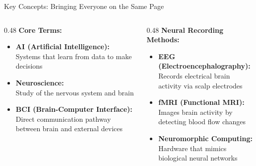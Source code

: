 \documentclass[aspectratio=169]{beamer}
\begin{document}
\begin{frame}{Key Concepts: Bringing Everyone on the Same Page}
  \begin{columns}[T]
    \begin{column}{0.48\textwidth}
      \textbf{Core Terms:}
      \begin{itemize}
        \item \textbf{AI (Artificial Intelligence):}\\
        {\small Systems that learn from data to make decisions}
        
        \item \textbf{Neuroscience:}\\
        {\small Study of the nervous system and brain}
        
        \item \textbf{BCI (Brain-Computer Interface):}\\
        {\small Direct communication pathway between brain and external devices}
      \end{itemize}
    \end{column}
    
    \begin{column}{0.48\textwidth}
      \textbf{Neural Recording Methods:}
      \begin{itemize}
        \item \textbf{EEG (Electroencephalography):}\\
        {\small Records electrical brain activity via scalp electrodes}
        
        \item \textbf{fMRI (Functional MRI):}\\
        {\small Images brain activity by detecting blood flow changes}
        
        \item \textbf{Neuromorphic Computing:}\\
        {\small Hardware that mimics biological neural networks}
      \end{itemize}
    \end{column}
  \end{columns}
\end{frame}
\end{document}
